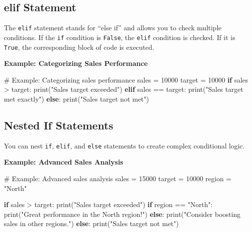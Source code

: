 \documentclass[
  letterpaper,
  DIV=11,
  numbers=noendperiod]{scrreprt}
\newenvironment{Shaded}{\begin{snugshade}}{\end{snugshade}}
\newcommand{\BuiltInTok}[1]{\textcolor[rgb]{0.00,0.23,0.31}{#1}}
\newcommand{\CommentTok}[1]{\textcolor[rgb]{0.37,0.37,0.37}{#1}}
\newcommand{\ControlFlowTok}[1]{\textcolor[rgb]{0.00,0.23,0.31}{\textbf{#1}}}
\newcommand{\DecValTok}[1]{\textcolor[rgb]{0.68,0.00,0.00}{#1}}
\newcommand{\NormalTok}[1]{\textcolor[rgb]{0.00,0.23,0.31}{#1}}
\newcommand{\OperatorTok}[1]{\textcolor[rgb]{0.37,0.37,0.37}{#1}}
\newcommand{\StringTok}[1]{\textcolor[rgb]{0.13,0.47,0.30}{#1}}
\begin{document}
\subsection{elif Statement}\label{elif-statement}

The \texttt{elif} statement stands for ``else if'' and allows you to
check multiple conditions. If the \texttt{if} condition is
\texttt{False}, the \texttt{elif} condition is checked. If it is
\texttt{True}, the corresponding block of code is executed.

\textbf{Example: Categorizing Sales Performance}

\begin{Shaded}
\begin{Highlighting}[]
\CommentTok{\# Example: Categorizing sales performance}
\NormalTok{sales }\OperatorTok{=} \DecValTok{10000}
\NormalTok{target }\OperatorTok{=} \DecValTok{10000}
\ControlFlowTok{if}\NormalTok{ sales }\OperatorTok{\textgreater{}}\NormalTok{ target:}
    \BuiltInTok{print}\NormalTok{(}\StringTok{"Sales target exceeded"}\NormalTok{)}
\ControlFlowTok{elif}\NormalTok{ sales }\OperatorTok{==}\NormalTok{ target:}
    \BuiltInTok{print}\NormalTok{(}\StringTok{"Sales target met exactly"}\NormalTok{)}
\ControlFlowTok{else}\NormalTok{:}
    \BuiltInTok{print}\NormalTok{(}\StringTok{"Sales target not met"}\NormalTok{)}
\end{Highlighting}
\end{Shaded}

\subsection{Nested If Statements}\label{nested-if-statements}

You can nest \texttt{if}, \texttt{elif}, and \texttt{else} statements to
create complex conditional logic.

\textbf{Example: Advanced Sales Analysis}

\begin{Shaded}
\begin{Highlighting}[]
\CommentTok{\# Example: Advanced sales analysis}
\NormalTok{sales }\OperatorTok{=} \DecValTok{15000}
\NormalTok{target }\OperatorTok{=} \DecValTok{10000}
\NormalTok{region }\OperatorTok{=} \StringTok{"North"}

\ControlFlowTok{if}\NormalTok{ sales }\OperatorTok{\textgreater{}}\NormalTok{ target:}
    \BuiltInTok{print}\NormalTok{(}\StringTok{"Sales target exceeded"}\NormalTok{)}
    \ControlFlowTok{if}\NormalTok{ region }\OperatorTok{==} \StringTok{"North"}\NormalTok{:}
        \BuiltInTok{print}\NormalTok{(}\StringTok{"Great performance in the North region!"}\NormalTok{)}
    \ControlFlowTok{else}\NormalTok{:}
        \BuiltInTok{print}\NormalTok{(}\StringTok{"Consider boosting sales in other regions."}\NormalTok{)}
\ControlFlowTok{else}\NormalTok{:}
    \BuiltInTok{print}\NormalTok{(}\StringTok{"Sales target not met"}\NormalTok{)}
\end{Highlighting}
\end{Shaded}
\end{document}
